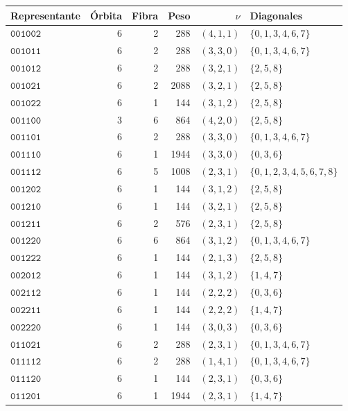 \begin{longtable}{@{}lrrrrl@{}}
\toprule Representante&Órbita&Fibra&Peso&\(\nu\)&Diagonales\\\midrule\endhead
\(\mathtt{001002}\)&6&2&288&\((4,1,1)\)&\(\{0,1,3,4,6,7\}\)\\
\(\mathtt{001011}\)&6&2&288&\((3,3,0)\)&\(\{0,1,3,4,6,7\}\)\\
\(\mathtt{001012}\)&6&2&288&\((3,2,1)\)&\(\{2,5,8\}\)\\
\(\mathtt{001021}\)&6&2&2088&\((3,2,1)\)&\(\{2,5,8\}\)\\
\(\mathtt{001022}\)&6&1&144&\((3,1,2)\)&\(\{2,5,8\}\)\\
\(\mathtt{001100}\)&3&6&864&\((4,2,0)\)&\(\{2,5,8\}\)\\
\(\mathtt{001101}\)&6&2&288&\((3,3,0)\)&\(\{0,1,3,4,6,7\}\)\\
\(\mathtt{001110}\)&6&1&1944&\((3,3,0)\)&\(\{0,3,6\}\)\\
\(\mathtt{001112}\)&6&5&1008&\((2,3,1)\)&\(\{0,1,2,3,4,5,6,7,8\}\)\\
\(\mathtt{001202}\)&6&1&144&\((3,1,2)\)&\(\{2,5,8\}\)\\
\(\mathtt{001210}\)&6&1&144&\((3,2,1)\)&\(\{2,5,8\}\)\\
\(\mathtt{001211}\)&6&2&576&\((2,3,1)\)&\(\{2,5,8\}\)\\
\(\mathtt{001220}\)&6&6&864&\((3,1,2)\)&\(\{0,1,3,4,6,7\}\)\\
\(\mathtt{001222}\)&6&1&144&\((2,1,3)\)&\(\{2,5,8\}\)\\
\(\mathtt{002012}\)&6&1&144&\((3,1,2)\)&\(\{1,4,7\}\)\\
\(\mathtt{002112}\)&6&1&144&\((2,2,2)\)&\(\{0,3,6\}\)\\
\(\mathtt{002211}\)&6&1&144&\((2,2,2)\)&\(\{1,4,7\}\)\\
\(\mathtt{002220}\)&6&1&144&\((3,0,3)\)&\(\{0,3,6\}\)\\
\(\mathtt{011021}\)&6&2&288&\((2,3,1)\)&\(\{0,1,3,4,6,7\}\)\\
\(\mathtt{011112}\)&6&2&288&\((1,4,1)\)&\(\{0,1,3,4,6,7\}\)\\
\(\mathtt{011120}\)&6&1&144&\((2,3,1)\)&\(\{0,3,6\}\)\\
\(\mathtt{011201}\)&6&1&1944&\((2,3,1)\)&\(\{1,4,7\}\)\\

\end{longtable}
